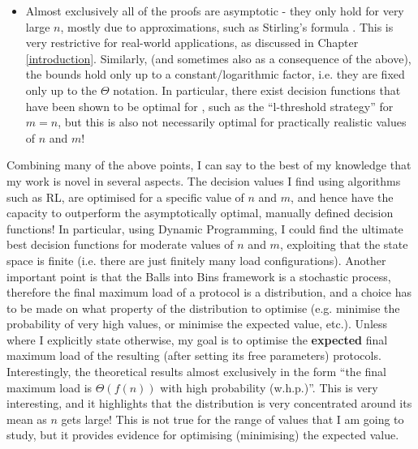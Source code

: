 \begin{itemize}
    \item
    Almost exclusively all of the proofs are asymptotic - they only hold for very large $n$, mostly due to approximations, such as Stirling's formula \cite{feldheim2021thinning}. This is very restrictive for real-world applications, as discussed in Chapter \ref{introduction}. Similarly, (and sometimes also as a consequence of the above), the bounds hold only up to a constant/logarithmic factor, i.e. they are fixed only up to the $\Theta$ notation. In particular, there exist decision functions that have been shown to be optimal for \TwoThinning, such as the ``l-threshold strategy'' for $m=n$, but this is also not necessarily optimal for practically realistic values of $n$ and $m$! 
\end{itemize}


Combining many of the above points, I can say to the best of my knowledge that my work is novel in several aspects. The decision values I find using algorithms such as RL, are optimised for a specific value of $n$ and $m$, and hence have the capacity to outperform the asymptotically optimal, manually defined decision functions! In particular, using Dynamic Programming, I could find the ultimate best decision functions for moderate values of $n$ and $m$, exploiting that the state space is finite (i.e. there are just finitely many load configurations). Another important point is that the Balls into Bins framework is a stochastic process, therefore the final maximum load of a protocol is a distribution, and a choice has to be made on what property of the distribution to optimise (e.g. minimise the probability of very high values, or minimise the expected value, etc.). Unless where I explicitly state otherwise, my goal is to optimise the \textbf{expected} final maximum load of the resulting (after setting its free parameters) protocols. Interestingly, the theoretical results almost exclusively in the form ``the final maximum load is $\Theta(f(n))$ with high probability (w.h.p.)''. This is very interesting, and it highlights that the distribution is very concentrated around its mean as $n$ gets large! This is not true for the range of values that I am going to study, but it provides evidence for optimising (minimising) the expected value. 

